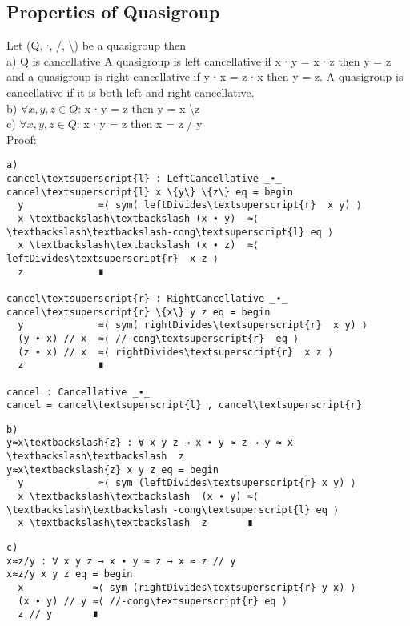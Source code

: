 \subsection{Properties of Quasigroup}
Let (Q, ∙, /, \textbackslash ) be a quasigroup then \\
a) Q is cancellative
A quasigroup is left cancellative if x ∙ y = x ∙ z then y = z and a quasigroup is right cancellative if y ∙ x = z ∙ x then y = z. A quasigroup is cancellative if it is both left and right cancellative.\\
b) \(\forall x, y, z \in Q\): x ∙ y = z then y = x \textbackslash z\\
c) \(\forall x, y, z \in Q\): x ∙ y = z then x = z / y\\

Proof:
\begin{Verbatim}[commandchars=\\\{\},samepage=true]
a)
cancel\textsuperscript{l} : LeftCancellative _∙_
cancel\textsuperscript{l} x \{y\} \{z\} eq = begin
  y             ≈⟨ sym( leftDivides\textsuperscript{r}  x y) ⟩
  x \textbackslash\textbackslash (x ∙ y)  ≈⟨ \textbackslash\textbackslash-cong\textsuperscript{l} eq ⟩
  x \textbackslash\textbackslash (x ∙ z)  ≈⟨ leftDivides\textsuperscript{r}  x z ⟩
  z             ∎

cancel\textsuperscript{r} : RightCancellative _∙_
cancel\textsuperscript{r} \{x\} y z eq = begin
  y             ≈⟨ sym( rightDivides\textsuperscript{r}  x y) ⟩
  (y ∙ x) // x  ≈⟨ //-cong\textsuperscript{r}  eq ⟩
  (z ∙ x) // x  ≈⟨ rightDivides\textsuperscript{r}  x z ⟩
  z             ∎

cancel : Cancellative _∙_
cancel = cancel\textsuperscript{l} , cancel\textsuperscript{r} 
\end{Verbatim}

\begin{Verbatim}[commandchars=\\\{\},samepage=true]
b)
y≈x\textbackslash{z} : ∀ x y z → x ∙ y ≈ z → y ≈ x \textbackslash\textbackslash  z
y≈x\textbackslash{z} x y z eq = begin
  y             ≈⟨ sym (leftDivides\textsuperscript{r} x y) ⟩
  x \textbackslash\textbackslash  (x ∙ y) ≈⟨ \textbackslash\textbackslash -cong\textsuperscript{l} eq ⟩
  x \textbackslash\textbackslash  z       ∎
\end{Verbatim}

\begin{Verbatim}[commandchars=\\\{\},samepage=true]
c)
x≈z/y : ∀ x y z → x ∙ y ≈ z → x ≈ z // y
x≈z/y x y z eq = begin
  x            ≈⟨ sym (rightDivides\textsuperscript{r} y x) ⟩
  (x ∙ y) // y ≈⟨ //-cong\textsuperscript{r} eq ⟩
  z // y       ∎
\end{Verbatim}

